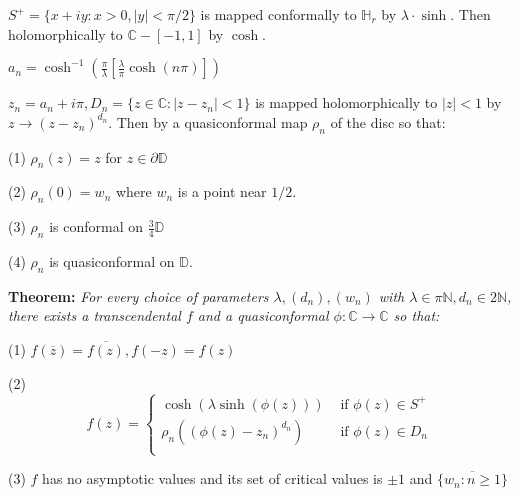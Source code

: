 \documentclass{beamer}
\begin{document}
\begin{frame} 

{\tiny $S^+ = \{ x + iy : x > 0, |y| < \pi/2 \}$ is mapped conformally to $\mathbb{H}_r$ by $\lambda\cdot\sinh$. Then holomorphically to $\mathbb{C} - [-1,1]$ by $\cosh$.

\vspace{1.25mm}

$a_n = \cosh^{-1}\left( \frac{\pi}{\lambda} \left[ \frac{\lambda}{\pi} \cosh(n\pi) \right] \right)$

\vspace{1.25mm}

$z_n = a_n + i\pi, D_n = \{ z \in \mathbb{C} : \left| z - z_n \right| < 1\} $ is mapped holomorphically to $|z|<1$ by $z\rightarrow (z - z_n)^{d_n}$. Then by a quasiconformal map $\rho_n$ of the disc so that: 

\hspace{5mm} (1) $\rho_n(z)=z$ for $z\in\partial\mathbb{D}$

\hspace{5mm} (2) $\rho_n(0)=w_n$ where $w_n$ is a point near $1/2$.

\hspace{5mm} (3) $\rho_n$ is conformal on $\frac{3}{4}\mathbb{D}$

\hspace{5mm} (4) $\rho_n$ is quasiconformal on $\mathbb{D}$.  

}

\vspace{5mm}

{\bf Theorem:}  {\it For every choice of parameters $\lambda, (d_n), (w_n)$ with $\lambda \in \pi\mathbb{N}, d_n \in 2\mathbb{N}$, there exists a transcendental $f$ and a quasiconformal $\phi: \mathbb{C}\rightarrow\mathbb{C}$ so that:}

\hspace{5mm} (1) $f(\overline{z}) = \overline{f(z)}, f(-z)=f(z)$

\hspace{5mm} (2) \[ f(z) = \begin{cases} 
      \cosh(\lambda\sinh(\phi(z))) & \textrm{ if } \phi(z)\in S^+ \\
      \rho_n((\phi(z)-z_n)^{d_n}) & \textrm{ if } \phi(z)\in D_n \\
   \end{cases} \]
   
\hspace{5mm} (3) $f$ has no asymptotic values and its set of critical values is $\pm1$ and $\overline{\{w_n: n \geq 1\}}$

\end{frame}
\end{document}
